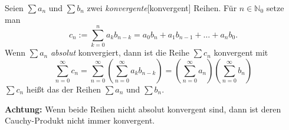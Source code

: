 Seien $\sum a_n$ und $\sum b_n$ zwei \textit{konvergente}[konvergent] Reihen. Für $n \in \mathbb{N}_0$ setze man
$$c_n := \sum_{k=0}^n a_k b_{n-k} = a_0 b_n + a_1 b_{n-1} + \dots + a_n b_0.$$
Wenn $\sum a_n$ \textit{absolut} konvergiert, dann ist die Reihe $\sum c_n$ konvergent mit
$$\sum_{n=0}^\infty c_n = \sum_{n=0}^\infty \left( \sum_{n=0}^\infty a_k b_{n-k} \right) = \left( \sum_{n=0}^\infty a_n \right) \left(\sum_{n=0}^\infty b_n \right)$$
$\sum c_n$ heißt das  der Reihen $\sum a_n$ und $\sum b_n$. \par
\textbf{Achtung:} Wenn beide Reihen nicht absolut konvergent sind, dann ist deren Cauchy-Produkt nicht immer konvergent.